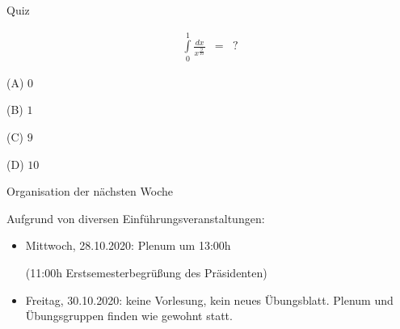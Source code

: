 \documentclass[german]{beamer}
\newcommand{\bq}{\begin{eqnarray*}}
\newcommand{\eq}{\end{eqnarray*}}
\begin{document}
\begin{frame}{Quiz}

\bq
 \int\limits_0^1 \frac{dx}{x^{\frac{9}{10}}}
 & = & ?
\eq
\begin{description}
\item{(A)} $0$
\item{(B)} $1$
\item{(C)} $9$
\item{(D)} $10$
\end{description}

\end{frame}


\begin{frame}{Organisation der n\"achsten Woche}

Aufgrund von diversen Einf\"uhrungsveranstaltungen:
\begin{itemize}
\item Mittwoch, 28.10.2020: Plenum um 13:00h 

(11:00h Erstsemesterbegr\"u{\ss}ung des Pr\"asidenten)
\item Freitag, 30.10.2020: keine Vorlesung, kein neues \"Ubungsblatt.
Plenum und \"Ubungsgruppen finden wie gewohnt statt.
\end{itemize}

\end{frame}


\begin{frame}

\end{frame}
\end{document}
